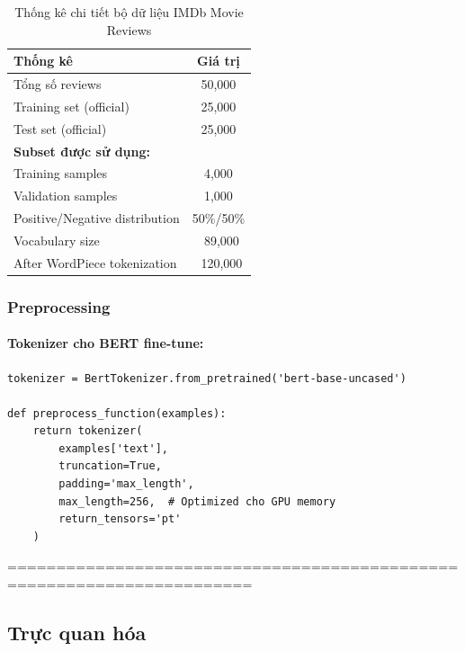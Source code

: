 \begin{table}[H]
\centering
\caption{Thống kê chi tiết bộ dữ liệu IMDb Movie Reviews}
\label{tab:imdb_statistics}
\begin{tabular}{lc}
\toprule
\textbf{Thống kê} & \textbf{Giá trị} \\
\midrule
Tổng số reviews & 50,000 \\
Training set (official) & 25,000 \\
Test set (official) & 25,000 \\
\midrule
\textbf{Subset được sử dụng:} & \\
Training samples & 4,000 \\
Validation samples & 1,000 \\
\midrule
Positive/Negative distribution & 50\%/50\% \\
\midrule
Vocabulary size & ~89,000 \\
After WordPiece tokenization & ~120,000\\
\bottomrule
\end{tabular}
\end{table}

\subsubsection{Preprocessing}
\label{subsubsec:preprocessing_steps}

\paragraph{Tokenizer cho BERT fine-tune:}
\begin{verbatim}
tokenizer = BertTokenizer.from_pretrained('bert-base-uncased')

def preprocess_function(examples):
    return tokenizer(
        examples['text'],
        truncation=True,
        padding='max_length',
        max_length=256,  # Optimized cho GPU memory
        return_tensors='pt'
    )
\end{verbatim}

=======================================================================
\subsection{Trực quan hóa}
\label{subsec:visualization}

